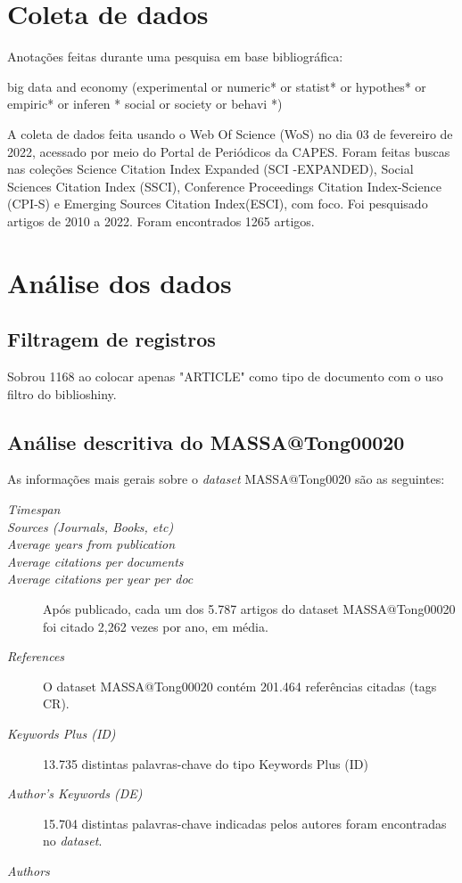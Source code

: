 \section{Coleta de dados}

Anotações feitas durante uma pesquisa em base bibliográfica:

big data and economy (experimental  or  numeric* or  statist* or  hypothes* or  empiric* or  inferen * social  or  society  or  behavi *)

A coleta de dados feita usando o Web Of Science (WoS) no dia 03 de fevereiro de 2022, acessado por meio do Portal de Periódicos da CAPES. Foram feitas buscas nas coleções Science  Citation  Index  Expanded (SCI -EXPANDED), Social Sciences  Citation  Index (SSCI), Conference Proceedings Citation Index-Science (CPI-S) e Emerging Sources Citation Index(ESCI), com foco.
Foi pesquisado artigos de 2010 a 2022.
Foram encontrados 1265 artigos.

\section{Análise dos dados}

\subsection{Filtragem de registros}

Sobrou 1168 ao colocar apenas "ARTICLE" como tipo de documento com o uso filtro do biblioshiny.



\subsection{Análise descritiva do %
MASSA@Tong00020}

As informações mais gerais sobre o \textit{dataset} MASSA@Tong0020 são as seguintes:
\begin{description}
    \item[\textit{Timespan}]
    \item [\textit{Sources (Journals, Books, etc)}] 
     \item [\textit{Average years from publication}] 
     \item [\textit{Average citations per documents}]
     \item [\textit{Average citations per year per doc}] Após publicado, cada um dos 5.787 artigos do dataset MASSA@Tong00020  foi citado 2,262 vezes por ano, em média.
    \item [\textit{References}] O dataset MASSA@Tong00020 contém 201.464 referências citadas (tags CR).
    \item [\textit{Keywords Plus (ID)}] 13.735 distintas palavras-chave do tipo Keywords Plus (ID)
    \item [\textit{Author's Keywords (DE)}] 15.704 distintas palavras-chave indicadas pelos autores foram encontradas no \textit{dataset}.
    \item [\textit{Authors}]
    
\end{description}

